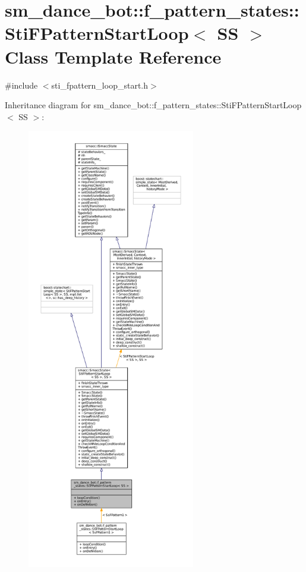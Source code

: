 \hypertarget{structsm__dance__bot_1_1f__pattern__states_1_1StiFPatternStartLoop}{}\section{sm\+\_\+dance\+\_\+bot\+:\+:f\+\_\+pattern\+\_\+states\+:\+:Sti\+F\+Pattern\+Start\+Loop$<$ SS $>$ Class Template Reference}
\label{structsm__dance__bot_1_1f__pattern__states_1_1StiFPatternStartLoop}


{\ttfamily \#include $<$sti\+\_\+fpattern\+\_\+loop\+\_\+start.\+h$>$}



Inheritance diagram for sm\+\_\+dance\+\_\+bot\+:\+:f\+\_\+pattern\+\_\+states\+:\+:Sti\+F\+Pattern\+Start\+Loop$<$ SS $>$\+:
\nopagebreak
\begin{figure}[H]
\begin{center}
\leavevmode
\includegraphics[height=550pt]{structsm__dance__bot_1_1f__pattern__states_1_1StiFPatternStartLoop__inherit__graph}
\end{center}
\end{figure}


